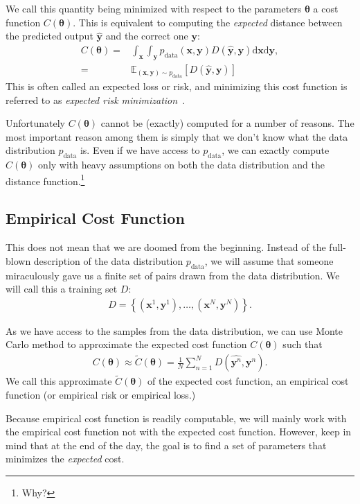 \documentclass{report}
\newcommand{\vect}[1]{\mathbf{#1}}
\newcommand{\vects}[1]{\boldsymbol{#1}}
\newcommand{\vx}[0]{\vect{x}}
\newcommand{\vy}[0]{\vect{y}}
\newcommand{\TT}[0]{\vects{\theta}}
\newcommand{\E}[0]{\mathbb{E}}
\newcommand{\dd}[1]{\ensuremath{\mbox{d}#1}}
\begin{document}
We call this quantity being minimized with respect to the parameters $\TT$ a
cost function $C(\TT)$. This is equivalent to computing the {\em expected}
distance between the predicted output $\hat{\vy}$ and the correct one $\vy$:
\begin{align}
    \label{eq:expected_cost}
    C(\TT) =& \int_{\vx} \int_{\vy} p_{\text{data}}(\vx, \vy) D(\hat{\vy}, \vy) \dd{\vx}
    \dd{\vy}, \\
    =& \E_{(\vx,\vy) \sim p_{\text{data}}}\left[ D(\hat{\vy}, \vy) \right] 
\end{align}
This is often called an expected loss or risk, and minimizing this cost function
is referred to as {\em expected risk minimization}~\cite{Vapnik1995}.

Unfortunately $C(\TT)$ cannot be (exactly) computed for a number of reasons. The
most important reason among them is simply that we don't know what the data
distribution $p_{\text{data}}$ is. Even if we have access to $p_{\text{data}}$,
we can exactly compute $C(\TT)$ only with heavy assumptions on both the data
distribution and the distance function.\footnote{Why?} 

\subsection{Empirical Cost Function}

This does not mean that we are doomed from the beginning. Instead of the
full-blown description of the data distribution $p_{\text{data}}$, we will
assume that someone miraculously gave us a finite set of pairs drawn from the
data distribution. We will call this a training set $D$:
\begin{align*}
    D=\left\{ (\vx^1, \vy^1), \ldots, (\vx^N, \vy^N) \right\}.  
\end{align*}

As we have access to the samples from the data distribution, we can use Monte
Carlo method to approximate the expected cost function $C(\TT)$ such that
\begin{align}
    \label{eq:empirical_cost}
    C(\TT) \approx \tilde{C}(\TT) = \frac{1}{N} \sum_{n=1}^N D(\hat{\vy^{n}},
    \vy^{n}).
\end{align}
We call this approximate $\tilde{C}(\TT)$ of the expected cost function, an
empirical cost function (or empirical risk or empirical loss.)

Because empirical cost function is readily computable, we will mainly work with
the empirical cost function not with the expected cost function. However, keep
in mind that at the end of the day, the goal is to find a set of parameters that
minimizes the {\em expected} cost.
\end{document}
